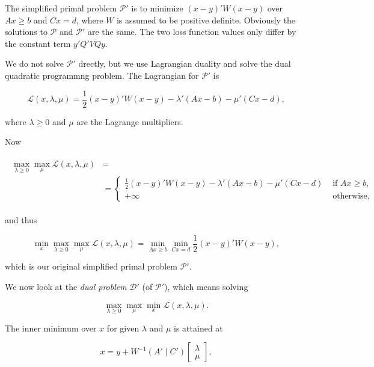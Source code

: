 \documentclass[
  12pt,
]{book}
\theoremstyle{definition}
\theoremstyle{definition}
\theoremstyle{definition}
\theoremstyle{definition}
\theoremstyle{remark}
\begin{document}
The simplified primal problem \(\mathcal{P}'\) is to minimize \((x-y)'W(x-y)\) over \(Ax\geq b\) and \(Cx=d\), where \(W\) is assumed to be positive definite. Obviously
the solutions to \(\mathcal{P}\) and \(\mathcal{P}'\) are the same. The two loss function values only differ by the constant term \(y'Q'VQy\).

We do not solve \(\mathcal{P}'\) drectly, but we use Lagrangian duality and solve the dual quadratic programmng problem. The Lagrangian for \(\mathcal{P}'\) is

\begin{equation}
\mathcal{L}(x,\lambda,\mu)=\frac12(x-y)'W(x-y)-
\lambda'(Ax - b)-\mu'(Cx-d),
\label{eq:qplagrange}
\end{equation}

where \(\lambda\geq 0\) and \(\mu\) are the Lagrange multipliers.

Now

\begin{align}
\begin{split}
\max_{\lambda\geq 0}\max_\mu\mathcal{L}(x,\lambda,\mu)&=\\
&=\begin{cases}\frac12(x-y)'W(x-y)-\lambda'(Ax - b)-\mu'(Cx-d)&\text{ if }Ax\geq b,\\
+\infty&\text{ otherwise},
\end{cases}
\end{split}
\label{eq:qpxcalc1}
\end{align}

and thus

\begin{equation}
\min_x\max_{\lambda\geq 0}\max_\mu\mathcal{L}(x,\lambda,\mu)=\min_{Ax\geq b}\min_{Cx=d}\frac12(x-y)'W(x-y),
\label{eq:qpxcalc2}
\end{equation}

which is our original simplified primal problem \(\mathcal{P}'\).

We now look at the \emph{dual problem} \(\mathcal{D}'\) (of \(\mathcal{P}'\)), which means solving

\begin{equation}
\max_{\lambda\geq 0}\max_\mu\min_x\mathcal{L}(x,\lambda,\mu).
\label{eq:qpdual}
\end{equation}

The inner minimum over \(x\) for given \(\lambda\) and \(\mu\) is attained at

\begin{equation}
x=y+W^{-1}(A'\mid C')\begin{bmatrix}\lambda\\\mu\end{bmatrix},
\label{eq:qpxsolve}
\end{equation}
\end{document}
